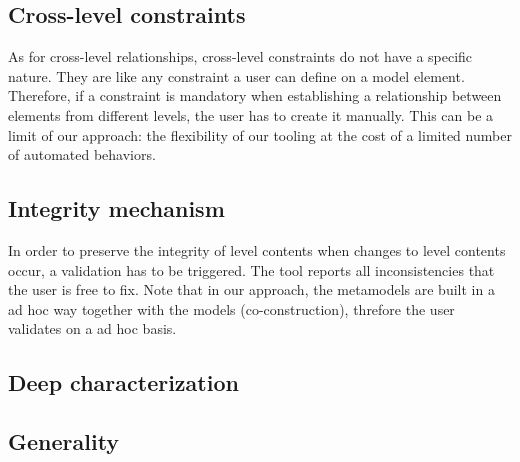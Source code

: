   \subsection{Cross-level constraints}


  As for cross-level relationships, cross-level constraints do not have a
  specific nature. They are like any constraint a user can define on a model
  element. Therefore, if a constraint is mandatory when establishing a
  relationship between elements from different levels, the user has to create
  it manually. This can be a limit of our approach: the flexibility of our
  tooling at the cost of a limited number of automated behaviors. 
  

  \subsection{Integrity mechanism}


  In order to preserve the integrity of level contents when changes to level
  contents occur, a validation has to be triggered. The tool reports all
  inconsistencies that the user is free to fix. Note that in our approach, the
  metamodels are built in a ad hoc way  together with the models
  (co-construction), threfore the user validates on a ad hoc basis.

  \subsection{Deep characterization}



  \subsection{Generality}


